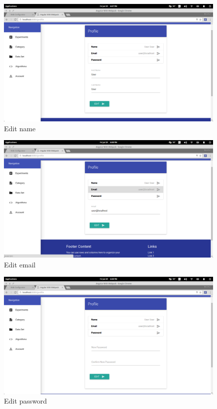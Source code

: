 \documentclass[11pt,a4paper]{article}
\begin{document}
\begin{figure}[H]
	\begin{center}
		\includegraphics[scale=0.3]{../Images/User Manual/Profile Page1.png}
		\caption{Edit name}
		\label{fig:ProfilePage1}
	\end{center}  
\end{figure}
\begin{figure}[H]
	\begin{center}
		\includegraphics[scale=0.3]{../Images/User Manual/Profile Page2.png}
		\caption{Edit email}
		\label{fig:ProfilePage2}
	\end{center}  
\end{figure}
\begin{figure}[H]
	\begin{center}
		\includegraphics[scale=0.3]{../Images/User Manual/Profile Page3.png}
		\caption{Edit password}
		\label{fig:ProfilePage3}
	\end{center}  
\end{figure}
\end{document}
